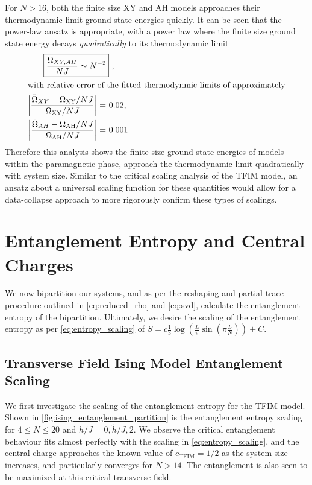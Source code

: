 \documentclass[12pt]{article}{}
\begin{document}
For $N>16$, both the finite size XY and AH models approaches their thermodynamic limit ground state energies quickly. It can be seen that the power-law ansatz is appropriate, with a power law where the finite size ground state energy decays \emph{quadratically} to its thermodynamic limit
\begin{align}
  \Aboxed{\frac{\Omega_{XY,AH}}{NJ} \sim N^{-2}}~, \label{eq:xyah_energyscaling_fit} \\
  \intertext{with relative error of the fitted thermodynmic limits of approximately}
  \abs{\frac{\bar{\Omega}_{XY} - \Omega_{\textrm{XY}}/{NJ}}{\Omega_{\textrm{XY}}/{NJ}}} =&~ 0.02, \\
  \abs{\frac{\bar{\Omega}_{AH} - \Omega_{\textrm{AH}}/{NJ}}{\Omega_{\textrm{AH}}/{NJ}}} =&~ 0.001.
\end{align}
Therefore this analysis shows the finite size ground state energies of models within the paramagnetic phase, approach the thermodynamic limit quadratically with system size. Similar to the critical scaling analysis of the TFIM model, an ansatz about a universal scaling function for these quantities would allow for a data-collapse approach to more rigorously confirm these types of scalings.

\newpage
\section{Entanglement Entropy and Central Charges}
We now bipartition our systems, and as per the reshaping and partial trace procedure outlined in \cref{eq:reduced_rho} and \cref{eq:svd}, calculate the entanglement entropy of the bipartition. Ultimately, we desire the scaling of the entanglement entropy as per \cref{eq:entropy_scaling} of $S = c \frac{1}{3}\log{\left(\frac{L}{\pi} \sin{(\pi \frac{L}{N})}\right)} + C$. 

\subsection{Transverse Field Ising Model Entanglement Scaling}
We first investigate the scaling of the entanglement entropy for the TFIM model. Shown in \cref{fig:ising_entanglement_partition} is the entanglement entropy scaling for $4 \leq N \leq 20$ and $h/J = 0,\tilde{h}/J,2$. We observe the critical entanglement behaviour fits almost perfectly with the scaling in \cref{eq:entropy_scaling}, and the central charge approaches the known value \cite{Cole2017} of $\boxed{c_{\textrm{TFIM}} = 1/2}$ as the system size increases, and particularly converges for $N>14$. The entanglement is also seen to be maximized at this critical transverse field.
\end{document}

